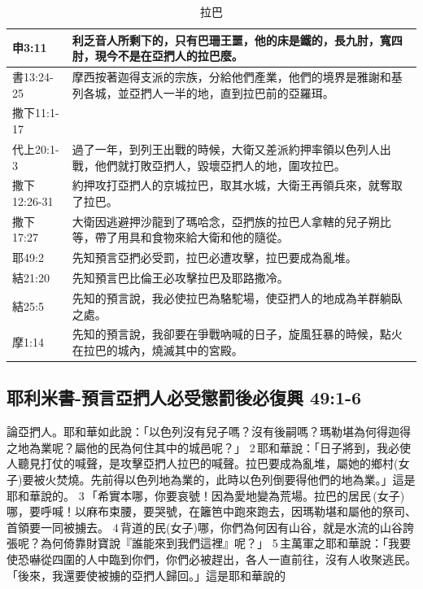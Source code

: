 \begin{table}[H]
\centering 
\begin{tabular}{p{}|p{15.5cm}}\hline\hline
申3:11&利乏音人所剩下的，只有巴珊王噩，他的床是鐵的，長九肘，寬四肘，現今不是在亞捫人的拉巴麼。\\\hline

書13:24-25&摩西按著迦得支派的宗族，分給他們產業，他們的境界是雅謝和基列各城，並亞捫人一半的地，直到拉巴前的亞羅珥。\\\hline

撒下11:1-17&\\\hline
代上20:1-3&過了一年，到列王出戰的時候，大衛又差派約押率領以色列人出戰，他們就打敗亞捫人，毀壞亞捫人的地，圍攻拉巴。\\\hline

撒下12:26-31&約押攻打亞捫人的京城拉巴，取其水城，大衛王再領兵來，就奪取了拉巴。\\\hline

撒下17:27&大衛因逃避押沙龍到了瑪哈念，亞捫族的拉巴人拿轄的兒子朔比等，帶了用具和食物來給大衛和他的隨從。\\\hline

耶49:2&先知預言亞捫必受罰，拉巴必遭攻擊，拉巴要成為亂堆。\\\hline

結21:20&先知預言巴比倫王必攻擊拉巴及耶路撒冷。\\\hline

結25:5&先知的預言說，我必使拉巴為駱駝場，使亞捫人的地成為羊群躺臥之處。\\\hline

摩1:14&先知的預言說，我卻要在爭戰吶喊的日子，旋風狂暴的時候，點火在拉巴的城內，燒滅其中的宮殿。\\\hline
\end{tabular}
\caption{拉巴}
\end{table}


\subsection{耶利米書-預言亞捫人必受懲罰後必復興 49:1-6}
論亞捫人。耶和華如此說：「以色列沒有兒子嗎？沒有後嗣嗎？瑪勒堪為何得迦得之地為業呢？屬他的民為何住其中的城邑呢？」 2 耶和華說：「日子將到，我必使人聽見打仗的喊聲，是攻擊亞捫人拉巴的喊聲。拉巴要成為亂堆，屬她的鄉村(女子)要被火焚燒。先前得以色列地為業的，此時以色列倒要得他們的地為業。」這是耶和華說的。 3 「希實本哪，你要哀號！因為愛地變為荒場。拉巴的居民 (女子)哪，要呼喊！以麻布束腰，要哭號，在籬笆中跑來跑去，因瑪勒堪和屬他的祭司、首領要一同被擄去。 4 背道的民(女子)哪，你們為何因有山谷，就是水流的山谷誇張呢？為何倚靠財寶說『誰能來到我們這裡』呢？」 5 主萬軍之耶和華說：「我要使恐嚇從四圍的人中臨到你們，你們必被趕出，各人一直前往，沒有人收聚逃民。「後來，我還要使被擄的亞捫人歸回。」這是耶和華說的

